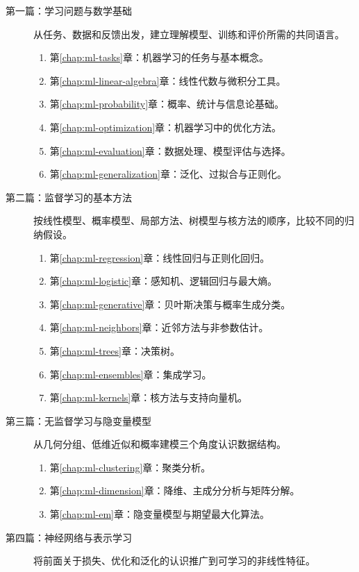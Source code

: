 \begin{description}
  \item[第一篇：学习问题与数学基础]
  从任务、数据和反馈出发，建立理解模型、训练和评价所需的共同语言。
  \begin{enumerate}
    \item 第\ref{chap:ml-tasks}章：机器学习的任务与基本概念。
    \item 第\ref{chap:ml-linear-algebra}章：线性代数与微积分工具。
    \item 第\ref{chap:ml-probability}章：概率、统计与信息论基础。
    \item 第\ref{chap:ml-optimization}章：机器学习中的优化方法。
    \item 第\ref{chap:ml-evaluation}章：数据处理、模型评估与选择。
    \item 第\ref{chap:ml-generalization}章：泛化、过拟合与正则化。
  \end{enumerate}
  \item[第二篇：监督学习的基本方法]
  按线性模型、概率模型、局部方法、树模型与核方法的顺序，比较不同的归纳假设。
  \begin{enumerate}
    \item 第\ref{chap:ml-regression}章：线性回归与正则化回归。
    \item 第\ref{chap:ml-logistic}章：感知机、逻辑回归与最大熵。
    \item 第\ref{chap:ml-generative}章：贝叶斯决策与概率生成分类。
    \item 第\ref{chap:ml-neighbors}章：近邻方法与非参数估计。
    \item 第\ref{chap:ml-trees}章：决策树。
    \item 第\ref{chap:ml-ensembles}章：集成学习。
    \item 第\ref{chap:ml-kernels}章：核方法与支持向量机。
  \end{enumerate}
  \item[第三篇：无监督学习与隐变量模型]
  从几何分组、低维近似和概率建模三个角度认识数据结构。
  \begin{enumerate}
    \item 第\ref{chap:ml-clustering}章：聚类分析。
    \item 第\ref{chap:ml-dimension}章：降维、主成分分析与矩阵分解。
    \item 第\ref{chap:ml-em}章：隐变量模型与期望最大化算法。
  \end{enumerate}
  \item[第四篇：神经网络与表示学习]
  将前面关于损失、优化和泛化的认识推广到可学习的非线性特征。

\end{description}
